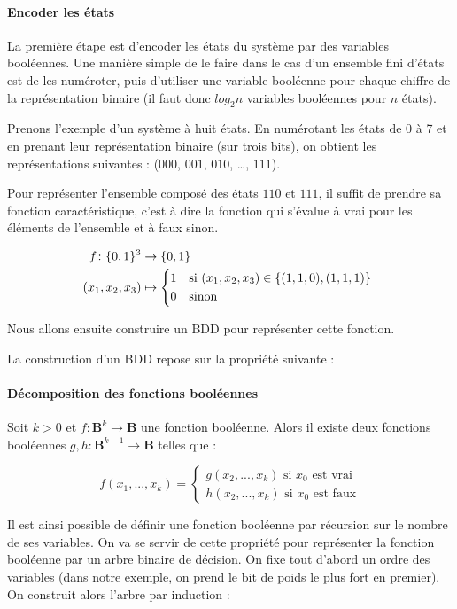 \paragraph{Encoder les états}
La première étape est d'encoder les états du système par des variables
booléennes. Une manière simple de le faire dans le cas d'un ensemble fini
d'états est de les numéroter, puis d'utiliser une variable booléenne pour chaque
chiffre de la représentation binaire (il faut donc \(log_2 n\) variables
booléennes pour \(n\) états).

Prenons l'exemple d'un système à huit états. En numérotant les états de 0 à 7 et
en prenant leur représentation binaire (sur trois bits), on obtient les
représentations suivantes : (\(000\), \(001\), \(010\), \dots, \(111\)).


Pour représenter l'ensemble composé des états \(110\) et \(111\), il suffit
de prendre sa fonction caractéristique, c'est à dire la fonction qui s'évalue à
vrai pour les éléments de l'ensemble et à faux sinon.

\begin{align}
  f \colon \{0, 1\}^3 & \to \{0, 1\} \\
  (x_1, x_2, x_3) & \mapsto
  \begin{cases*}
    1 & si \((x_1, x_2, x_3) \in \{(1,1,0), (1,1,1)\}\) \\
    0 & sinon
  \end{cases*}
\end{align}

Nous allons ensuite construire un BDD pour représenter cette fonction.

La construction d'un BDD repose sur la propriété suivante :

\paragraph{Décomposition des fonctions booléennes}
Soit \(k > 0\) et \(f: \mathbf{B}^k \to \mathbf{B}\) une
fonction booléenne. Alors il existe deux fonctions booléennes
\(g, h : \mathbf{B}^{k-1} \to \mathbf{B}\) telles que :

\[
f(x_1, ..., x_k) =
\begin{cases*}
  g(x_2, ..., x_k) \text{ si $x_0$ est vrai}\\
  h(x_2, ..., x_k) \text{ si $x_0$ est faux}
\end{cases*}
\]

Il est ainsi possible de définir une fonction booléenne par récursion
sur le nombre de ses variables. On va se servir de cette propriété pour
représenter la fonction booléenne par un arbre binaire de décision. On
fixe tout d'abord un ordre des variables (dans notre exemple, on prend
le bit de poids le plus fort en premier). On construit alors l'arbre
par induction :

